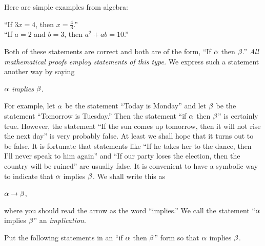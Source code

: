 \documentclass[11pt]{book}
\begin{document}
Here are simple examples from algebra:

\begin{center}
``If $3x = 4$, then $x = \tfrac{4}{3}$.''\\[2pt]
``If $a = 2$ and $b = 3$, then $a^2 + ab = 10$.''
\end{center}

Both of these statements are correct and both are of the form, ``If $\alpha$ then
$\beta$.''
\emph{All mathematical proofs employ statements of this type.} We express such a
statement another way by saying

\begin{center}
$\alpha$ \emph{implies} $\beta$.
\end{center}

For example, let $\alpha$ be the statement ``Today is Monday'' and let $\beta$ be the
statement ``Tomorrow is Tuesday.'' Then the statement ``if $\alpha$ then $\beta$'' is
certainly true. However, the statement ``If the sun comes up tomorrow, then it
will not rise the next day'' is very probably false. At least we shall hope that
it turns out to be false. It is fortunate that statements like ``If he takes her
to the dance, then I'll never speak to him again'' and ``If our party loses the
election, then the country will be ruined'' are usually false. It is convenient to
have a symbolic way to indicate that $\alpha$ implies $\beta$. We shall write this as

\begin{center}
$\alpha \rightarrow \beta$,
\end{center}

\noindent where you should read the arrow as the word ``implies.'' We call the
statement ``$\alpha$ implies $\beta$'' an \emph{implication}.


Put the following statements in an ``if $\alpha$ then $\beta$'' form so that $\alpha$
implies $\beta$.
\end{document}
